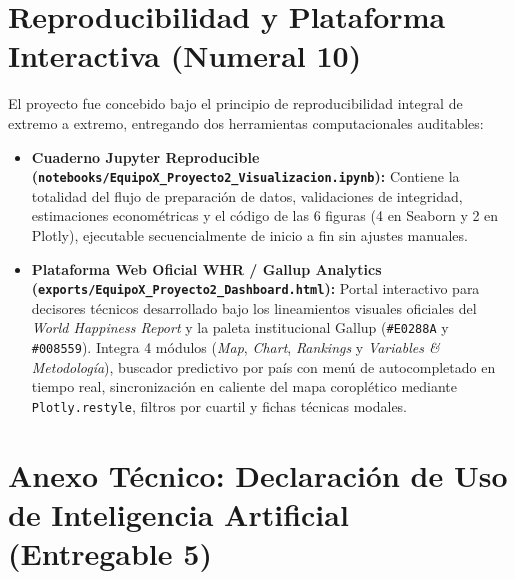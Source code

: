 \documentclass[11pt]{article}
\begin{document}
\section{Reproducibilidad y Plataforma Interactiva (Numeral 10)}

El proyecto fue concebido bajo el principio de reproducibilidad integral de extremo a extremo, entregando dos herramientas computacionales auditables:

\begin{itemize}
    \item \textbf{Cuaderno Jupyter Reproducible (\nolinkurl{notebooks/EquipoX_Proyecto2_Visualizacion.ipynb}):} Contiene la totalidad del flujo de preparación de datos, validaciones de integridad, estimaciones econométricas y el código de las 6 figuras (4 en Seaborn y 2 en Plotly), ejecutable secuencialmente de inicio a fin sin ajustes manuales.
    \item \textbf{Plataforma Web Oficial WHR / Gallup Analytics (\nolinkurl{exports/EquipoX_Proyecto2_Dashboard.html}):} Portal interactivo para decisores técnicos desarrollado bajo los lineamientos visuales oficiales del \textit{World Happiness Report} y la paleta institucional Gallup (\texttt{\#E0288A} y \texttt{\#008559}). Integra 4 módulos (\textit{Map}, \textit{Chart}, \textit{Rankings} y \textit{Variables \& Metodología}), buscador predictivo por país con menú de autocompletado en tiempo real, sincronización en caliente del mapa coroplético mediante \texttt{Plotly.restyle}, filtros por cuartil y fichas técnicas modales.
\end{itemize}

\section{Anexo Técnico: Declaración de Uso de Inteligencia Artificial (Entregable 5)}
\end{document}
